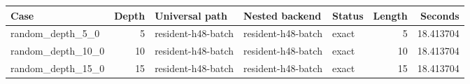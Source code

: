 {\small
\begin{tabular}{lrlllrr}
\hline
Case & Depth & Universal path & Nested backend & Status & Length & Seconds \\
\hline
random\_depth\_5\_0 & 5 & resident-h48-batch & resident-h48-batch & exact & 5 & 18.413704 \\
random\_depth\_10\_0 & 10 & resident-h48-batch & resident-h48-batch & exact & 10 & 18.413704 \\
random\_depth\_15\_0 & 15 & resident-h48-batch & resident-h48-batch & exact & 15 & 18.413704 \\
\hline
\end{tabular}
}
